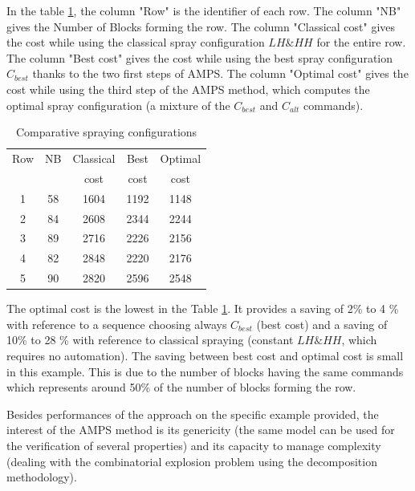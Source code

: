 \documentclass[preprint,3p,times,twocolumn]{elsarticle}
\begin{document}
In the table \ref{tb:CompCost}, the column "Row" is the identifier of each row. The column "NB" gives the Number of Blocks forming the row. The column "Classical cost" gives the cost while using the classical spray configuration $LH\&HH$ for the entire row. The column "Best cost" gives the cost while using the best spray configuration $C_{best}$ thanks to the two first steps of AMPS. The column "Optimal cost" gives the cost while using the third step of the AMPS method, which computes the optimal spray configuration (a mixture of the $C_{best}$ and $C_{alt}$ commands). %
\begin{table}[ht]
	\begin{center}
		\begin{tabular}{|c|c|c|c|c|}
			\hline 
			Row		& NB  		&	Classical   &	Best    &  Optimal      \\
			&   		&	 cost  &	 cost   &   cost     \\ \hline
			1		& 58		&   1604        	&	1192        &   1148           \\ \hline
			2		& 84		&	2608            &	2344        &   2244              \\ \hline
			3	    & 89	    &	2716        	&	2226        &   2156              \\ \hline
			4   	& 82    	&	2848            &	2220        &   2176            \\ \hline
			5	    & 90	    &	2820            &	2596        &   2548            \\ \hline
		\end{tabular} 
		\caption{Comparative spraying configurations}\label{tb:CompCost}
	\end{center}
\end{table}

The optimal cost is the lowest in the Table \ref{tb:CompCost}. It provides a saving of 2\% to 4 \% with reference to a sequence choosing always $C_{best}$ (best cost) and a saving of 10\% to 28 \% with reference to classical spraying (constant $LH\&HH$, which requires no automation). The saving between best cost and optimal cost is small in this example. This is due to the number of blocks having the same commands which represents around 50\% of the number of blocks forming the row.


Besides performances of the approach on the specific example provided, the interest of the AMPS method is its genericity (the same model can be used for the verification of several properties) and its capacity to manage complexity (dealing with the combinatorial explosion problem using the decomposition methodology). 
\end{document}
